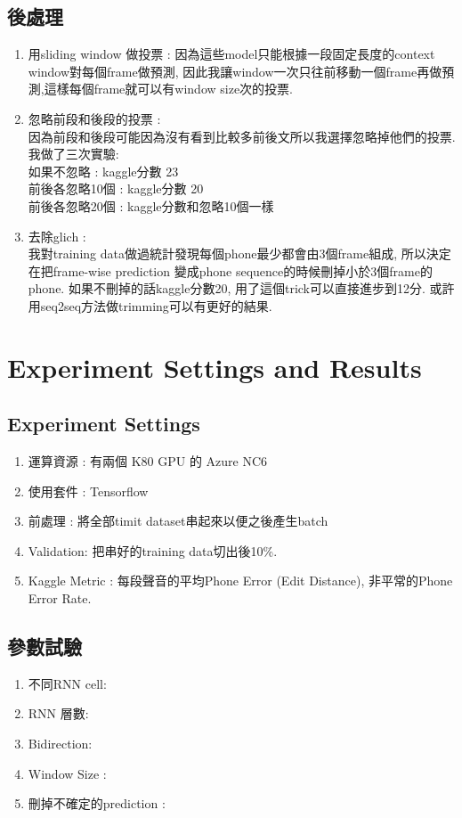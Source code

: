 \documentclass[12pt, a4paper]{article}
\begin{document}
		\subsection{後處理}
			\begin{enumerate}
			\item 用sliding window 做投票 : 
				因為這些model只能根據一段固定長度的context window對每個frame做預測, 因此我讓window一次只往前移動一個frame再做預測,這樣每個frame就可以有window size次的投票.
			\item 忽略前段和後段的投票 :\\ 
				因為前段和後段可能因為沒有看到比較多前後文所以我選擇忽略掉他們的投票.我做了三次實驗:\\ 
				如果不忽略 :		 kaggle分數 23\\
				前後各忽略10個 :   kaggle分數 20\\
				前後各忽略20個 :   kaggle分數和忽略10個一樣
			\item 去除glich :\\
				我對training data做過統計發現每個phone最少都會由3個frame組成,
				所以決定在把frame-wise prediction 變成phone sequence的時候刪掉小於3個frame的phone.
				如果不刪掉的話kaggle分數20, 用了這個trick可以直接進步到12分.
				或許用seq2seq方法做trimming可以有更好的結果.
			\end{enumerate}
	\section{Experiment Settings and Results}
		\subsection{Experiment Settings}
			\begin{enumerate}
				\item 運算資源 : 有兩個 K80 GPU 的 Azure NC6 
				\item 使用套件 : Tensorflow
				\item 前處理 : 
					將全部timit dataset串起來以便之後產生batch
				\item Validation: 把串好的training data切出後10\%.
				\item Kaggle Metric : 
					每段聲音的平均Phone Error (Edit Distance), 非平常的Phone Error Rate.
			\end{enumerate}
		\subsection{參數試驗}
			\begin{enumerate}
				\item 不同RNN cell:
				\item RNN 層數:
				\item Bidirection:
				\item Window Size :
				\item 刪掉不確定的prediction :
			\end{enumerate}
\end{document}
